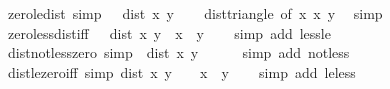 \begin{isabellebody}
\ zero{\isacharunderscore}{\kern0pt}le{\isacharunderscore}{\kern0pt}dist\ {\isacharbrackleft}{\kern0pt}simp{\isacharbrackright}{\kern0pt}{\isacharcolon}{\kern0pt}\ {\isachardoublequoteopen}{}\ {\isasymle}\ dist\ x\ y{\isachardoublequoteclose}\isanewline
%
\isadelimproof
\ \ %
\endisadelimproof
%
\isatagproof
{}\isamarkupfalse%
\ dist{\isacharunderscore}{\kern0pt}triangle{}\ {\isacharbrackleft}{\kern0pt}of\ x\ x\ y{\isacharbrackright}{\kern0pt}\ \isamarkupfalse%
\ simp%
\endisatagproof
{\isafoldproof}%
%
\isadelimproof
\isanewline
%
\endisadelimproof
\isanewline
{}\isamarkupfalse%
\ zero{\isacharunderscore}{\kern0pt}less{\isacharunderscore}{\kern0pt}dist{\isacharunderscore}{\kern0pt}iff{\isacharcolon}{\kern0pt}\ {\isachardoublequoteopen}{}\ {\isacharless}{\kern0pt}\ dist\ x\ y\ {\isasymlongleftrightarrow}\ x\ {\isasymnoteq}\ y{\isachardoublequoteclose}\isanewline
%
\isadelimproof
\ \ %
\endisadelimproof
%
\isatagproof
{}\isamarkupfalse%
\ {\isacharparenleft}{\kern0pt}simp\ add{\isacharcolon}{\kern0pt}\ less{\isacharunderscore}{\kern0pt}le{\isacharparenright}{\kern0pt}%
\endisatagproof
{\isafoldproof}%
%
\isadelimproof
\isanewline
%
\endisadelimproof
\isanewline
{}\isamarkupfalse%
\ dist{\isacharunderscore}{\kern0pt}not{\isacharunderscore}{\kern0pt}less{\isacharunderscore}{\kern0pt}zero\ {\isacharbrackleft}{\kern0pt}simp{\isacharbrackright}{\kern0pt}{\isacharcolon}{\kern0pt}\ {\isachardoublequoteopen}{\isasymnot}\ dist\ x\ y\ {\isacharless}{\kern0pt}\ {}{\isachardoublequoteclose}\isanewline
%
\isadelimproof
\ \ %
\endisadelimproof
%
\isatagproof
{}\isamarkupfalse%
\ {\isacharparenleft}{\kern0pt}simp\ add{\isacharcolon}{\kern0pt}\ not{\isacharunderscore}{\kern0pt}less{\isacharparenright}{\kern0pt}%
\endisatagproof
{\isafoldproof}%
%
\isadelimproof
\isanewline
%
\endisadelimproof
\isanewline
{}\isamarkupfalse%
\ dist{\isacharunderscore}{\kern0pt}le{\isacharunderscore}{\kern0pt}zero{\isacharunderscore}{\kern0pt}iff\ {\isacharbrackleft}{\kern0pt}simp{\isacharbrackright}{\kern0pt}{\isacharcolon}{\kern0pt}\ {\isachardoublequoteopen}dist\ x\ y\ {\isasymle}\ {}\ {\isasymlongleftrightarrow}\ x\ {\isacharequal}{\kern0pt}\ y{\isachardoublequoteclose}\isanewline
%
\isadelimproof
\ \ %
\endisadelimproof
%
\isatagproof
{}\isamarkupfalse%
\ {\isacharparenleft}{\kern0pt}simp\ add{\isacharcolon}{\kern0pt}\ le{\isacharunderscore}{\kern0pt}less{\isacharparenright}{\kern0pt}%
\endisatagproof
{\isafoldproof}%

\end{isabellebody}
